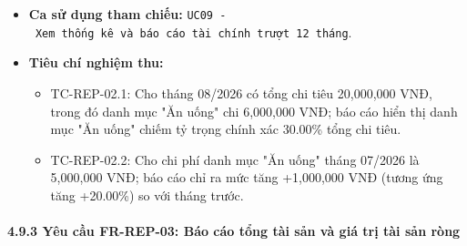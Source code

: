 \documentclass[11pt,a4paper]{article}
\providecommand{\tightlist}{
  \setlength{\itemsep}{0pt}\setlength{\parskip}{0pt}}
\begin{document}
\begin{itemize}
  \begin{itemize}
  \tightlist
  \item
    Bảng tổng hợp Pivot 2 tầng phân cấp (Nhóm -\textgreater{} Danh mục)
    kèm số tiền, tỷ trọng \%, so sánh chênh lệch với tháng trước.
  \item
    Dữ liệu sẵn sàng phục vụ biểu đồ tròn (cơ cấu) và biểu đồ cột (so
    sánh).
  \end{itemize}
\item
  \textbf{Ca sử dụng tham chiếu:}
  \texttt{UC09\ -\ Xem\ thống\ kê\ và\ báo\ cáo\ tài\ chính\ trượt\ 12\ tháng}.
\item
  \textbf{Tiêu chí nghiệm thu:}

  \begin{itemize}
  \tightlist
  \item
    TC-REP-02.1: Cho tháng 08/2026 có tổng chi tiêu 20,000,000 VNĐ,
    trong đó danh mục "Ăn uống" chi 6,000,000 VNĐ; báo cáo hiển thị danh
    mục "Ăn uống" chiếm tỷ trọng chính xác 30.00\% tổng chi tiêu.
  \item
    TC-REP-02.2: Cho chi phí danh mục "Ăn uống" tháng 07/2026 là
    5,000,000 VNĐ; báo cáo chỉ ra mức tăng +1,000,000 VNĐ (tương ứng
    tăng +20.00\%) so với tháng trước.
  \end{itemize}
\end{itemize}

\paragraph{4.9.3 Yêu cầu FR-REP-03: Báo cáo tổng tài sản và giá trị tài
sản
ròng}\label{493-yuxeau-cux1ea7u-fr-rep-03-buxe1o-cuxe1o-tux1ed5ng-tuxe0i-sux1ea3n-vuxe0-giuxe1-trux1ecb-tuxe0i-sux1ea3n-ruxf2ng}
\end{document}
